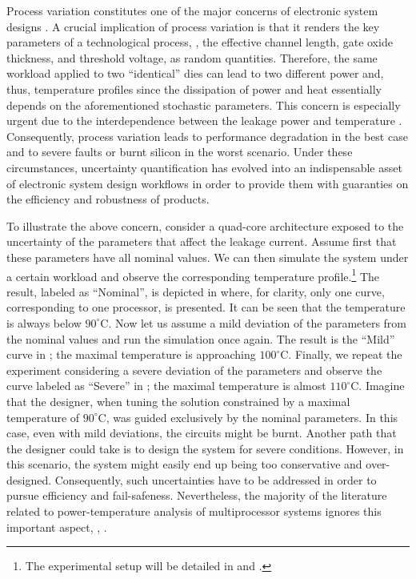 
Process variation constitutes one of the major concerns of electronic system designs \cite{chandrakasan2001, srivastava2010}.
A crucial implication of process variation is that it renders the key parameters of a technological process, \eg, the effective channel length, gate oxide thickness, and threshold voltage, as random quantities.
Therefore, the same workload applied to two ``identical'' dies can lead to two different power and, thus, temperature profiles since the dissipation of power and heat essentially depends on the aforementioned stochastic parameters.
This concern is especially urgent due to the interdependence between the leakage power and temperature \cite{srivastava2010, liu2007}.
Consequently, process variation leads to performance degradation in the best case and to severe faults or burnt silicon in the worst scenario.
Under these circumstances, uncertainty quantification \cite{xiu2010, maitre2010} has evolved into an indispensable asset of electronic system design workflows in order to provide them with guaranties on the efficiency and robustness of products.

To illustrate the above concern, consider a quad-core architecture exposed to the uncertainty of the parameters that affect the leakage current.
Assume first that these parameters have all nominal values.
We can then simulate the system under a certain workload and observe the corresponding temperature profile.\footnote{The experimental setup will be detailed in  and .}
The result, labeled as ``Nominal'', is depicted in  where, for clarity, only one curve, corresponding to one processor, is presented.
It can be seen that the temperature is always below $90^{\circ}$C.
Now let us assume a mild deviation of the parameters from the nominal values and run the simulation once again.
The result is the ``Mild'' curve in ; the maximal temperature is approaching $100^{\circ}$C.
Finally, we repeat the experiment considering a severe deviation of the parameters and observe the curve labeled as ``Severe'' in ; the maximal temperature is almost $110^{\circ}$C.
Imagine that the designer, when tuning the solution constrained by a maximal temperature of $90^\circ$C, was guided exclusively by the nominal parameters.
In this case, even with mild deviations, the circuits might be burnt.
Another path that the designer could take is to design the system for severe conditions.
However, in this scenario, the system might easily end up being too conservative and over-designed.
Consequently, such uncertainties have to be addressed in order to pursue efficiency and fail-safeness.
Nevertheless, the majority of the literature related to power-temperature analysis of multiprocessor systems ignores this important aspect, \eg, \cite{rao2009, rai2011, thiele2011, ukhov2012}.

